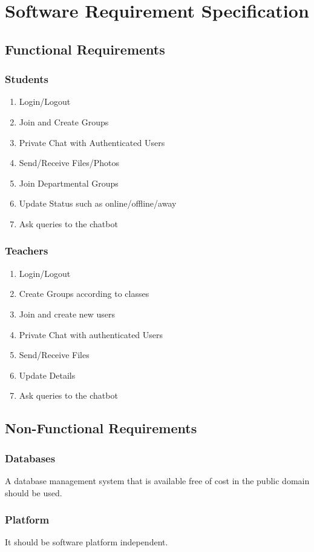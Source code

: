 \section{Software Requirement Specification}
\subsection{Functional Requirements}
\subsubsection{Students}
\begin{enumerate}
\item Login/Logout
\item Join and Create Groups
\item Private Chat with Authenticated Users
\item Send/Receive Files/Photos
\item Join Departmental Groups
\item Update Status such as online/offline/away
\item Ask queries to the chatbot
\end{enumerate}
\subsubsection{Teachers}
\begin{enumerate}
\item Login/Logout
\item Create Groups according to classes
\item Join and create new users
\item Private Chat with authenticated Users
\item Send/Receive Files
\item Update Details
\item Ask queries to the chatbot
\end{enumerate}
\subsection{Non-Functional Requirements}
\subsubsection{Databases}
A database management system that is available free of cost in the public domain should be used.
\subsubsection{Platform}
It should be software platform independent.
